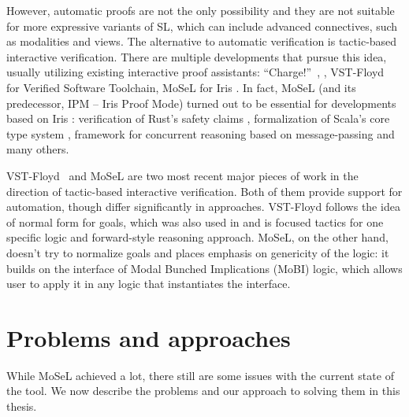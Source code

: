 However, automatic proofs are not the only possibility and they are not suitable for more expressive variants of SL, which can include advanced connectives, such as modalities and views.
The alternative to automatic verification is tactic-based interactive verification.
There are multiple developments that pursue this idea, usually utilizing existing interactive proof assistants: ``Charge!''~\cite{bengtsonCharge2012},
, VST-Floyd~\cite{caoVSTFloydSeparationLogic2018} for Verified Software Toolchain, MoSeL for Iris \cite{krebbersInteractiveProofsHigherorder2017, krebbersMoSeLGeneralExtensible2018}.
In fact, MoSeL (and its predecessor, IPM -- Iris Proof Mode) turned out to be essential for developments based on Iris \cite{krebbersMoSeLGeneralExtensible2018, jungUnderstandingEvolvingRust2020}: verification of Rust's safety claims \cite{jungRustBeltSecuringFoundations2018, jungStackedBorrowsAliasing2019, dangRustBeltMeetsRelaxed2019}, formalization of Scala's core type system \cite{giarrussoScalaStepbystepSoundness2020}, framework for concurrent reasoning based on message-passing \cite{hinrichsenActrisSessiontypeBased2019} and many others.

VST-Floyd~\cite{caoVSTFloydSeparationLogic2018} and MoSeL \cite{krebbersMoSeLGeneralExtensible2018} are two most recent major pieces of work in the direction of tactic-based interactive verification.
Both of them provide support for automation, though differ significantly in approaches.
VST-Floyd follows the idea of normal form for goals, which was also used in \cite{bengtsonCharge2012} and is focused tactics for one specific logic and forward-style reasoning approach.
MoSeL, on the other hand, doesn't try to normalize goals and places emphasis on genericity of the logic: it builds on the interface of Modal Bunched Implications (MoBI) logic, which allows user to apply it in any logic that instantiates the interface.

\section{Problems and approaches}
\label{sec:problems-approaches-intro}

While MoSeL achieved a lot, there still are some issues with the current state of the tool.
We now describe the problems and our approach to solving them in this thesis.


